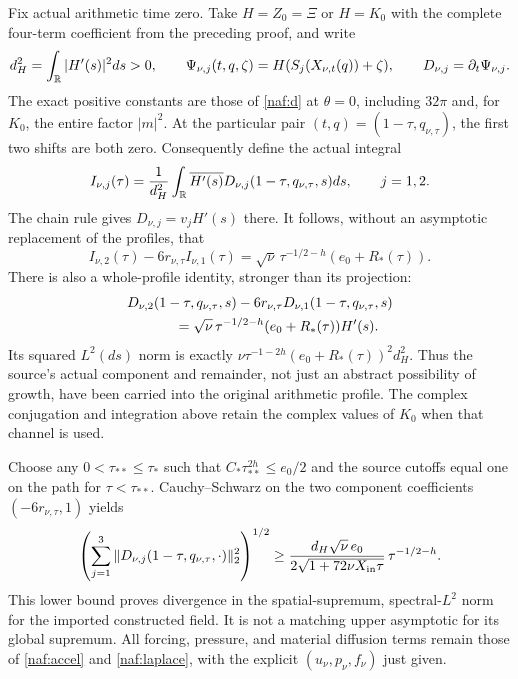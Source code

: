 Fix actual arithmetic time zero. Take $H=Z_0=\Xi$ or $H=K_0$ with
the complete four-term coefficient from the preceding proof, and write
\[
 d_H^2=\int_\mathbb R|H'(s)|^2ds>0,\qquad
 \Psi_{\nu,j}(t,q,\zeta)=H(S_j(X_{\nu,t}(q))+\zeta),
 \qquad D_{\nu,j}=\partial_t\Psi_{\nu,j}.
\]
The exact positive constants are those of \eqref{naf:d} at $\theta=0$,
including $32\pi$ and, for $K_0$, the entire factor $|m|^2$.
At the particular pair $(t,q)=(1-\tau,q_{\nu,\tau})$, the first two
shifts are both zero. Consequently define the actual integral
\[
 I_{\nu,j}(\tau)=\frac{1}{d_H^2}\int_\mathbb R
       \overline{H'(s)}D_{\nu,j}(1-\tau,q_{\nu,\tau},s)ds,
 \qquad j=1,2.
\]
The chain rule gives $D_{\nu,j}=v_jH'(s)$ there. It follows, without
an asymptotic replacement of the profiles, that
\begin{equation}
 I_{\nu,2}(\tau)-6r_{\nu,\tau}I_{\nu,1}(\tau)
 =\sqrt\nu\,\tau^{-1/2-h}(e_0+R_*(\tau)).
 \label{nw:integralblowup}
\end{equation}
There is also a whole-profile identity, stronger than its projection:
\begin{equation}
 \begin{split}
 &D_{\nu,2}(1-\tau,q_{\nu,\tau},s)
      -6r_{\nu,\tau}D_{\nu,1}(1-\tau,q_{\nu,\tau},s)\\
 &\hspace{12mm}=\sqrt\nu\,\tau^{-1/2-h}
                      (e_0+R_*(\tau))H'(s).
 \end{split}
 \label{nw:profileblowup}
\end{equation}
Its squared $L^2(ds)$ norm is exactly
$\nu\tau^{-1-2h}(e_0+R_*(\tau))^2d_H^2$.
Thus the source's actual component and remainder, not just an abstract
possibility of growth, have been carried into the original arithmetic
profile. The complex conjugation and integration above retain the
complex values of $K_0$ when that channel is used.

Choose any $0<\tau_{**}\leq\tau_*$ such that
$C_*\tau_{**}^{2h}\leq e_0/2$ and the source cutoffs equal one on
the path for $\tau<\tau_{**}$. Cauchy--Schwarz on the two component
coefficients $(-6r_{\nu,\tau},1)$ yields
\begin{equation}
 \left(\sum_{j=1}^3\|D_{\nu,j}
              (1-\tau,q_{\nu,\tau},\cdot)\|_2^2\right)^{1/2}
 \geq
 \frac{d_H\sqrt\nu\,e_0}
      {2\sqrt{1+72\nu X_{\rm in}\tau}}\,
              \tau^{-1/2-h}.
 \label{nw:lower}
\end{equation}
This lower bound proves divergence in the spatial-supremum,
spectral-$L^2$ norm for the imported constructed field. It is not a
matching upper asymptotic for its global supremum. All forcing,
pressure, and material diffusion terms remain those of
\eqref{naf:accel} and \eqref{naf:laplace}, with the explicit
$(u_\nu,p_\nu,f_\nu)$ just given.

